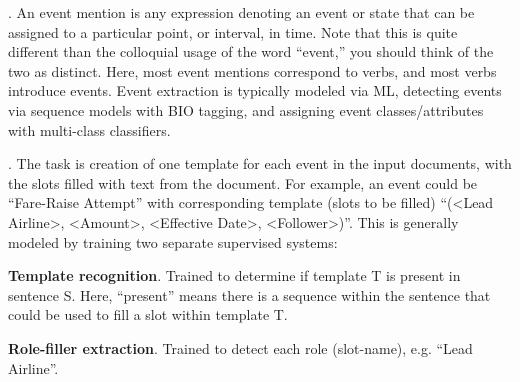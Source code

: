 \documentclass[11pt]{article}
\newcommand\myspace[1][]{\vspace{#1\bigskipamount}}
\newcommand\p{\Needspace{10\baselineskip} \noindent}
\begin{document}
\myspace
\p {}. An event mention is any expression denoting an event or state that can be assigned to a particular point, or interval, in time. Note that this is quite different than the colloquial usage of the word ``event,'' you should think of the two as distinct. Here, most event mentions correspond to verbs, and most verbs introduce events. Event extraction is typically modeled via ML, detecting events via sequence models with BIO tagging, and assigning event classes/attributes with multi-class classifiers.

\myspace
\p {}. The task is creation of one template for each event in the input documents, with the slots filled with text from the document. For example, an event could be ``Fare-Raise Attempt'' with corresponding template (slots to be filled) ``(<Lead Airline>, <Amount>, <Effective Date>, <Follower>)''. This is generally modeled by training two separate supervised systems:
\begin{compactenum}
	\item \textbf{Template recognition}. Trained to determine if template T is present in sentence S. Here, ``present'' means there is a sequence within the sentence that could be used to fill a slot within template T.
	
	\item \textbf{Role-filler extraction}. Trained to detect each role (slot-name), e.g. ``Lead Airline''.
\end{compactenum}
\end{document}
